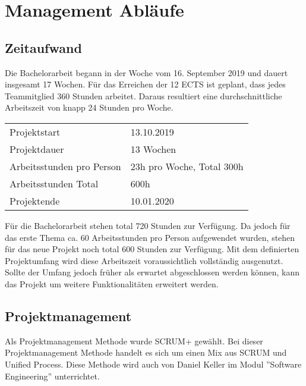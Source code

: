 \section{Management Abläufe}

\subsection{Zeitaufwand}
Die Bachelorarbeit begann in der Woche vom  16. September 2019 und dauert insgesamt 17 Wochen. Für das Erreichen der 12 ECTS ist geplant, dass jedes Teammitglied 360 Stunden arbeitet. Daraus resultiert eine durchschnittliche Arbeitszeit von knapp 24 Stunden pro Woche.

\begin{center}
	\begin{tabularx}{\textwidth}{p{} p{}}
	\toprule
	Projektstart & 13.10.2019 \\
	Projektdauer & 13 Wochen \\
	Arbeitsstunden pro Person & 23h pro Woche, Total 300h \\
	Arbeitsstunden Total & 600h \\
	Projektende & 10.01.2020 \\ \bottomrule
	\end{tabularx}
\end{center}

\noindent Für die Bachelorarbeit stehen total 720 Stunden zur Verfügung. Da jedoch für das erste Thema ca. 60 Arbeitsstunden pro Person aufgewendet wurden, stehen für das neue Projekt noch total 600 Stunden zur Verfügung. Mit dem definierten Projektumfang wird diese Arbeitszeit voraussichtlich vollständig ausgenutzt. Sollte der Umfang jedoch früher als erwartet abgeschlossen werden können, kann das Projekt um weitere Funktionalitäten erweitert werden.

\subsection{Projektmanagement}
Als Projektmanagement Methode wurde SCRUM+ gewählt. Bei dieser Projektmanagement Methode handelt es sich um einen Mix aus SCRUM und Unified Process. Diese Methode wird auch von Daniel Keller im Modul ''Software Engineering'' unterrichtet.

\newpage

